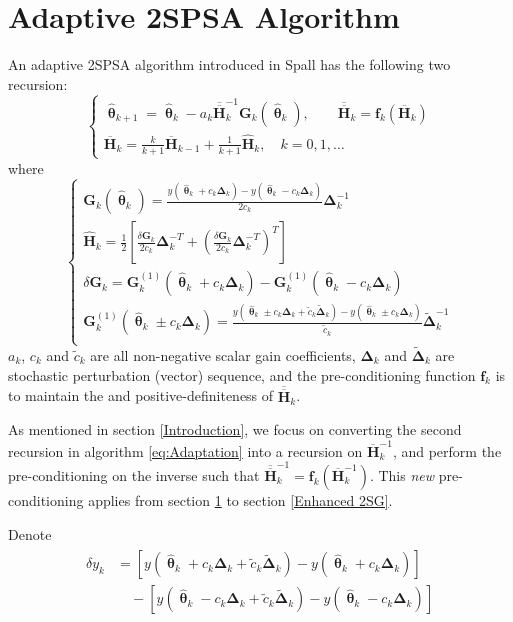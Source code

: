 \documentclass[conference]{IEEEtran}
\newcommand{\bG}{\bm{G}}
\newcommand{\bDelta}{\bm{\Delta}}
\newcommand{\oH}{\bm{\overline{H}}}
\newcommand{\ooH}{\bm{\overline{\overline{H}}}}
\newcommand{\hH}{\bm{\hat{H}}}
\newcommand{\htheta}{\bm{\hat{\uptheta}}}
\newcommand{\tDelta}{\bm{\tilde{\Delta}}}
\begin{document}
\section{Adaptive 2SPSA Algorithm} \label{2SPSA}
An adaptive 2SPSA algorithm introduced in Spall \cite{Spall2000} has the following two recursion:
\begin{equation} \label{eq:Adaptation}
\begin{cases}
\htheta_{k+1}=\htheta_k-a_k\ooH_k^{-1} \bG_k(\htheta_k),\qquad \bm{\ooH}_k=\bm{f}_k(\oH_k)\\
\oH_k=\frac{k}{k+1}\oH_{k-1}+\frac{1}{k+1}\hH_k, \quad k=0,1,\dots
\end{cases}
\end{equation}
where
\begin{equation} \label{eq:notations}
\begin{cases}
\bG_k(\htheta_k)=\frac{y(\htheta_k+c_k\bDelta_k)-y(\htheta_k-c_k\bDelta_k)}{2c_k}\bDelta_k^{-1}\\
\hH_k=\frac{1}{2}\left[ \frac{\delta\bG_k}{2c_k}\bDelta_k^{-T}+\left(\frac{\delta\bG_k}{2c_k}\bDelta_k^{-T}\right)^T \right]\\
\delta\bG_k=\bG_k^{(1)}(\htheta_k+ c_k\bDelta_k)-\bG_k^{(1)}(\htheta_k- c_k\bDelta_k)\\
\bG_k^{(1)}(\htheta_k\pm c_k\bDelta_k)
=\frac{y(\htheta_k\pm c_k\bDelta_k+\tilde{c}_k\tDelta_k)-y(\htheta_k\pm c_k\bDelta_k)}{\tilde{c}_k}\tDelta_k^{-1}\\
\end{cases}
\end{equation}
$ a_k $, $ c_k $ and $ \tilde{c}_k $ are all non-negative scalar gain coefficients, $ \bDelta_k $ and $ \tDelta_k $ are stochastic perturbation (vector) sequence, and the pre-conditioning function $ \bm{f}_k $ is to maintain the and positive-definiteness of $ \ooH_k $.

As mentioned in section \ref{Introduction}, we focus on converting the second recursion in algorithm \ref{eq:Adaptation} into a recursion on $\oH_k^{-1}$, and perform the pre-conditioning on the inverse such that $\bm{\ooH}_k^{-1}=\bm{f}_k(\oH_k^{-1})$. This \textit{new} pre-conditioning applies from section \ref{2SPSA} to section \ref{Enhanced 2SG}.

Denote 
\begin{align} \label{eq:dy}
\begin{split} 
\delta y_k&=[y(\htheta_k+c_k\bDelta_k+\tilde{c}_k\tDelta_k)-y(\htheta_k+c_k\bDelta_k)]\\
&\quad-[y(\htheta_k-c_k\bDelta_k+\tilde{c}_k\tDelta_k)-y(\htheta_k-c_k\bDelta_k)]
\end{split}
\end{align}
\end{document}
